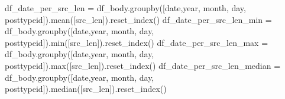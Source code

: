 \documentclass[
  letterpaper,
  DIV=11,
  numbers=noendperiod]{scrartcl}
\newenvironment{Shaded}{\begin{snugshade}}{\end{snugshade}}
\newcommand{\BuiltInTok}[1]{\textcolor[rgb]{0.00,0.23,0.31}{#1}}
\newcommand{\NormalTok}[1]{\textcolor[rgb]{0.00,0.23,0.31}{#1}}
\newcommand{\OperatorTok}[1]{\textcolor[rgb]{0.37,0.37,0.37}{#1}}
\newcommand{\StringTok}[1]{\textcolor[rgb]{0.13,0.47,0.30}{#1}}
\begin{document}
\begin{Shaded}
\begin{Highlighting}[]
\NormalTok{df\_date\_per\_src\_len }\OperatorTok{=}\NormalTok{ df\_body.groupby([}\StringTok{\textquotesingle{}date\textquotesingle{}}\NormalTok{,}\StringTok{\textquotesingle{}year\textquotesingle{}}\NormalTok{, }\StringTok{\textquotesingle{}month\textquotesingle{}}\NormalTok{, }\StringTok{\textquotesingle{}day\textquotesingle{}}\NormalTok{, }\StringTok{\textquotesingle{}posttypeid\textquotesingle{}}\NormalTok{]).mean([}\StringTok{\textquotesingle{}src\_len\textquotesingle{}}\NormalTok{]).reset\_index()}
\NormalTok{df\_date\_per\_src\_len\_min }\OperatorTok{=}\NormalTok{ df\_body.groupby([}\StringTok{\textquotesingle{}date\textquotesingle{}}\NormalTok{,}\StringTok{\textquotesingle{}year\textquotesingle{}}\NormalTok{, }\StringTok{\textquotesingle{}month\textquotesingle{}}\NormalTok{, }\StringTok{\textquotesingle{}day\textquotesingle{}}\NormalTok{, }\StringTok{\textquotesingle{}posttypeid\textquotesingle{}}\NormalTok{]).}\BuiltInTok{min}\NormalTok{([}\StringTok{\textquotesingle{}src\_len\textquotesingle{}}\NormalTok{]).reset\_index()}
\NormalTok{df\_date\_per\_src\_len\_max }\OperatorTok{=}\NormalTok{ df\_body.groupby([}\StringTok{\textquotesingle{}date\textquotesingle{}}\NormalTok{,}\StringTok{\textquotesingle{}year\textquotesingle{}}\NormalTok{, }\StringTok{\textquotesingle{}month\textquotesingle{}}\NormalTok{, }\StringTok{\textquotesingle{}day\textquotesingle{}}\NormalTok{, }\StringTok{\textquotesingle{}posttypeid\textquotesingle{}}\NormalTok{]).}\BuiltInTok{max}\NormalTok{([}\StringTok{\textquotesingle{}src\_len\textquotesingle{}}\NormalTok{]).reset\_index()}
\NormalTok{df\_date\_per\_src\_len\_median }\OperatorTok{=}\NormalTok{ df\_body.groupby([}\StringTok{\textquotesingle{}date\textquotesingle{}}\NormalTok{,}\StringTok{\textquotesingle{}year\textquotesingle{}}\NormalTok{, }\StringTok{\textquotesingle{}month\textquotesingle{}}\NormalTok{, }\StringTok{\textquotesingle{}day\textquotesingle{}}\NormalTok{, }\StringTok{\textquotesingle{}posttypeid\textquotesingle{}}\NormalTok{]).median([}\StringTok{\textquotesingle{}src\_len\textquotesingle{}}\NormalTok{]).reset\_index()}
\end{Highlighting}
\end{Shaded}
\end{document}
